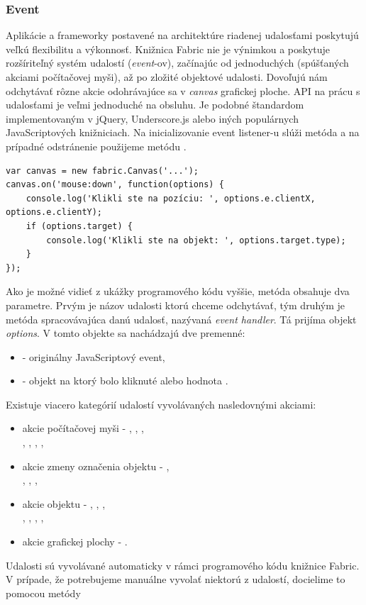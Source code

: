 \subsubsection{Event}

Aplikácie a frameworky postavené na architektúre riadenej udalosťami poskytujú veľkú flexibilitu a výkonnosť. Knižnica Fabric nie je výnimkou a poskytuje rozšíriteľný systém udalostí (\textit{event}-ov), začínajúc od jednoduchých (spúšťaných akciami počítačovej myši), až po zložité objektové udalosti. Dovoľujú nám odchytávať rôzne akcie odohrávajúce sa v \textit{canvas} grafickej ploche. API na prácu s udalosťami je veľmi jednoduché na obsluhu. Je podobné štandardom implementovaným v jQuery, Underscore.js alebo iných populárnych JavaScriptových knižniciach. Na inicializovanie event listener-u slúži metóda  a na prípadné odstránenie použijeme metódu .
\begin{lstlisting}[style=web,caption={Ukážka programovej implementácie na prácu s eventami},captionpos=b, label={lst:fabric-events}]
var canvas = new fabric.Canvas('...');
canvas.on('mouse:down', function(options) {
	console.log('Klikli ste na pozíciu: ', options.e.clientX, options.e.clientY);
	if (options.target) {
		console.log('Klikli ste na objekt: ', options.target.type);
	}
});
\end{lstlisting}
Ako je možné vidieť z ukážky programového kódu vyššie, metóda  obsahuje dva parametre. Prvým je názov udalosti ktorú chceme odchytávať, tým druhým je metóda spracovávajúca danú udalosť, nazývaná \textit{event handler}. Tá prijíma objekt \textit{options}. V tomto objekte sa nachádzajú dve premenné:
\begin{itemize}
	\item {} - originálny JavaScriptový event,
	\item {} - objekt na ktorý bolo kliknuté alebo hodnota .
\end{itemize}
Existuje viacero kategórií udalostí vyvolávaných nasledovnými akciami:
\begin{itemize}
	\item akcie počítačovej myši - , , , \\
	, , , ,
	\item akcie zmeny označenia objektu - , \\
	, , ,
	\item akcie objektu - , , , \\
	, , , ,
	\item akcie grafickej plochy - .
\end{itemize}
Udalosti sú vyvolávané automaticky v rámci programového kódu knižnice Fabric. V prípade, že potrebujeme manuálne vyvolať niektorú z udalostí, docielime to pomocou metódy  

